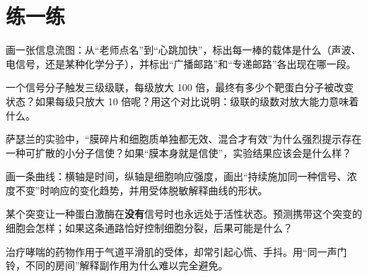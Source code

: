 \section*{练一练}

\begin{sikaoti}
\item 画一张信息流图：从“老师点名”到“心跳加快”，标出每一棒的载体是什么（声波、电信号，还是某种化学分子），并标出“广播邮路”和“专递邮路”各出现在哪一段。
\item 一个信号分子触发三级级联，每级放大 100 倍，最终有多少个靶蛋白分子被改变状态？如果每级只放大 10 倍呢？用这个对比说明：级联的级数对放大能力意味着什么。
\item 萨瑟兰的实验中，“膜碎片和细胞质单独都无效、混合才有效”为什么强烈提示存在一种可扩散的小分子信使？如果“膜本身就是信使”，实验结果应该会是什么样？
\item 画一条曲线：横轴是时间，纵轴是细胞响应强度，画出“持续施加同一种信号、浓度不变”时响应的变化趋势，并用受体脱敏解释曲线的形状。
\item 某个突变让一种蛋白激酶在\textbf{没有}信号时也永远处于活性状态。预测携带这个突变的细胞会怎样；如果这条通路恰好控制细胞分裂，后果可能是什么？
\item 治疗哮喘的药物作用于气道平滑肌的受体，却常引起心慌、手抖。用“同一声门铃，不同的房间”解释副作用为什么难以完全避免。
\end{sikaoti}
